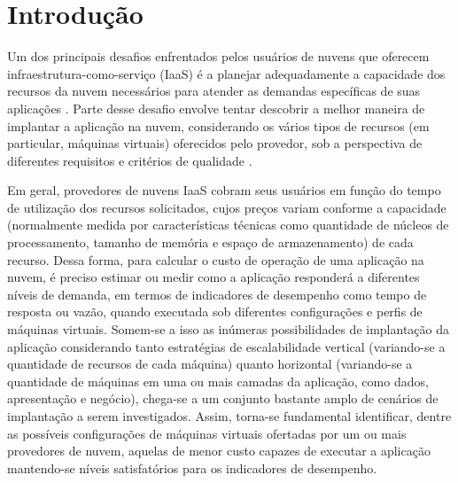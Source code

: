 \documentclass[12pt]{article}
\begin{document}
\section{Introdução}\label{sec:introducao}


Um dos principais desafios enfrentados pelos usuários de nuvens que oferecem infraestrutura-como-serviço (IaaS) é a planejar adequadamente a capacidade dos recursos da nuvem necessários para atender as demandas específicas de suas aplicações \cite{Menasce2009}.  Parte desse desafio envolve tentar descobrir a melhor maneira de implantar a aplicação na nuvem, considerando os vários tipos de recursos (em particular, máquinas virtuais) oferecidos pelo provedor, sob a perspectiva de diferentes requisitos e critérios de qualidade \cite{GoncalvesJunior2015}.  

Em geral, provedores de nuvens IaaS cobram seus usuários em função do tempo de utilização dos recursos solicitados, cujos preços variam conforme a capacidade (normalmente medida por características técnicas como quantidade de núcleos de processamento, tamanho de memória e espaço de armazenamento) de cada recurso. Dessa forma, para calcular o custo de operação de uma aplicação na nuvem, é preciso estimar ou medir como a aplicação responderá a diferentes níveis de demanda, em termos de indicadores de desempenho como tempo de resposta ou vazão, quando executada sob diferentes configurações e perfis de máquinas virtuais. Somem-se a isso as inúmeras possibilidades de implantação da aplicação considerando tanto estratégias de escalabilidade vertical (variando-se a quantidade de recursos de cada máquina) quanto horizontal (variando-se a quantidade de máquinas em uma ou mais camadas da aplicação, como dados, apresentação e negócio), chega-se a um conjunto bastante amplo de cenários de implantação a serem investigados. Assim, torna-se fundamental identificar, dentre as possíveis configurações de máquinas virtuais ofertadas por um ou mais provedores de nuvem, aquelas de menor custo capazes de executar a aplicação mantendo-se níveis satisfatórios para os indicadores de desempenho.
\end{document}
